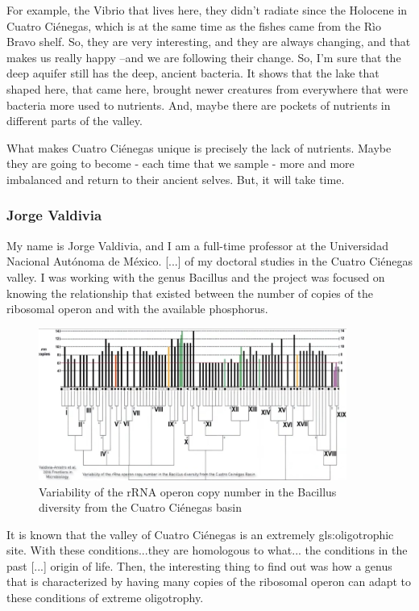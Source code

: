 \documentclass[]{article}
\begin{document}
For example, the Vibrio that lives here, they didn't radiate since the Holocene in Cuatro  Ci\'enegas, which is at the same time as the fishes came from the R\`io Bravo shelf. So, they are very interesting, and they are always changing, and that makes us really happy --and we are following their change. So, I'm sure that the deep aquifer still has the deep, ancient bacteria. It shows that the lake that shaped here, that came here, brought newer creatures from everywhere that were bacteria more used to nutrients. And, maybe there are pockets of nutrients in different parts of the valley.

What makes Cuatro  Ci\'enegas unique is precisely the lack of nutrients. Maybe they are going to become - each time that we sample - more and more imbalanced and return to their ancient selves. But, it will take time.

\subsubsection{Jorge Valdivia}

My name is Jorge Valdivia, and I am a full-time professor at the Universidad Nacional Aut\'onoma de M\'exico. [...] of my doctoral studies in the Cuatro  Ci\'enegas valley. I was working with the genus Bacillus and the project was focused on knowing the relationship that existed between the number of copies of the ribosomal operon and with the available phosphorus.\cite{valdivia2016variability}
\begin{figure}[H]
	\caption[Variability of the rRNA operon copy number]{Variability of the rRNA operon copy number in the Bacillus diversity from the Cuatro  Ci\'enegas basin} 
	\includegraphics[width=0.9\textwidth]{CuatroCienegas8}
\end{figure}

It is known that the valley of Cuatro  Ci\'enegas is an extremely \gls{gls:oligotroph}ic site. With these conditions...they are homologous to what... the conditions in the past [...] origin of life. Then, the interesting thing to find out was how a genus that is characterized by having many copies of the ribosomal operon can adapt to these conditions of extreme oligotrophy.
\end{document}
